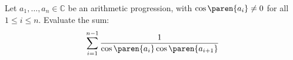 Let $a_1, \dotsc , a_n \in \mathbb{C}$ be an arithmetic progression,
with $\cos\paren{a_i} \neq 0$ for all $1 \leq i \leq n$.
Evaluate the sum:
\begin{equation*}
\sum\limits_{i = 1}^{n - 1} {\frac{1}{\cos\paren{a_i} \cos\paren{a_{i+1}}}}
\end{equation*}

